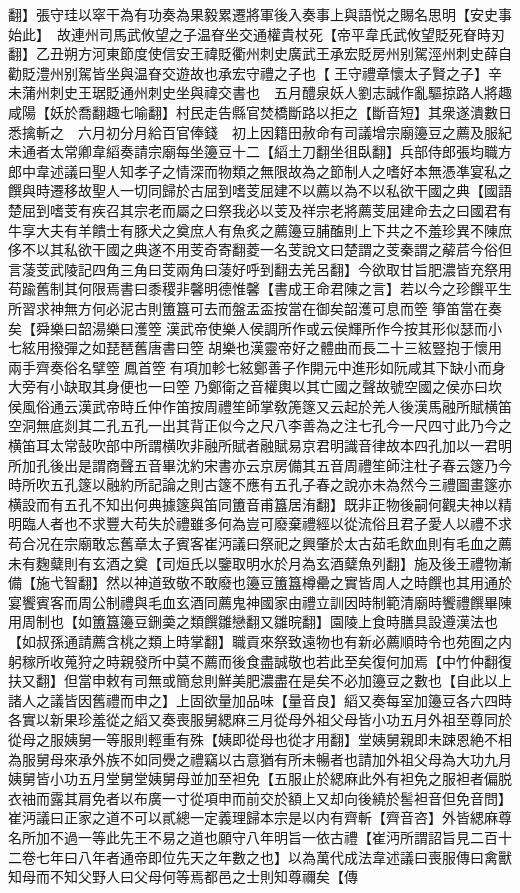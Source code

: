 翻】張守珪以窣干為有功奏為果毅累遷將軍後入奏事上與語悦之賜名思明【安史事始此】　故連州司馬武攸望之子温眘坐交通權貴杖死【帝平韋氏武攸望貶死眘時刃翻】乙丑朔方河東節度使信安王禕貶衢州刺史廣武王承宏貶房州别駕涇州刺史薛自勸貶澧州别駕皆坐與温眘交遊故也承宏守禮之子也【王守禮章懷太子賢之子】辛未蒲州刺史王琚貶通州刺史坐與禕交書也　五月醴泉妖人劉志誠作亂驅掠路人將趣咸陽【妖於喬翻趣七喻翻】村民走告縣官焚橋斷路以拒之【斷音短】其衆遂潰數日悉擒斬之　六月初分月給百官俸錢　初上因籍田赦命有司議增宗廟籩豆之薦及服紀未通者太常卿韋縚奏請宗廟每坐籩豆十二【縚土刀翻坐徂臥翻】兵部侍郎張均職方郎中韋述議曰聖人知孝子之情深而物類之無限故為之節制人之嗜好本無憑凖宴私之饌與時遷移故聖人一切同歸於古屈到嗜芰屈建不以薦以為不以私欲干國之典【國語楚屈到嗜芰有疾召其宗老而屬之曰祭我必以芰及祥宗老將薦芰屈建命去之曰國君有牛享大夫有羊饋士有豚犬之奠庶人有魚炙之薦籩豆脯醢則上下共之不羞珍異不陳庶侈不以其私欲干國之典遂不用芰奇寄翻菱一名芰說文曰楚謂之芰秦謂之薢茩今俗但言蓤芰武陵記四角三角曰芰兩角曰蓤好呼到翻去羌呂翻】今欲取甘旨肥濃皆充祭用苟踰舊制其何限焉書曰黍稷非馨明德惟馨【書成王命君陳之言】若以今之珍饌平生所習求神無方何必泥古則簠簋可去而盤盂盃按當在御矣韶濩可息而箜箏笛當在奏矣【舜樂曰韶湯樂曰濩箜漢武帝使樂人侯調所作或云侯輝所作今按其形似瑟而小七絃用撥彈之如琵琶舊唐書曰箜胡樂也漢靈帝好之體曲而長二十三絃豎抱于懷用兩手齊奏俗名擘箜鳳首箜有項加軫七絃鄭善子作開元中進形如阮咸其下缺小而身大旁有小缺取其身便也一曰箜乃鄭衛之音權輿以其亡國之聲故號空國之侯亦曰坎侯風俗通云漢武帝時丘仲作笛按周禮笙師掌敎箎篴又云起於羌人後漢馬融所賦横笛空洞無底剡其二孔五孔一出其背正似今之尺八李善為之注七孔今一尺四寸此乃今之横笛耳太常鼔吹部中所謂横吹非融所賦者融賦易京君明識音律故本四孔加以一君明所加孔後出是謂商聲五音畢沈約宋書亦云京房備其五音周禮笙師注杜子春云篴乃今時所吹五孔篴以融約所記論之則古篴不應有五孔子春之說亦未為然今三禮圖畫篴亦横設而有五孔不知出何典據篴與笛同簠音甫簋居洧翻】既非正物後嗣何觀夫神以精明臨人者也不求豐大苟失於禮雖多何為豈可廢棄禮經以從流俗且君子愛人以禮不求苟合况在宗廟敢忘舊章太子賓客崔沔議曰祭祀之興肇於太古茹毛飲血則有毛血之薦未有麴糵則有玄酒之奠【司烜氏以鑒取明水於月為玄酒糵魚列翻】施及後王禮物漸備【施弋智翻】然以神道致敬不敢廢也籩豆簠簋樽罍之實皆周人之時饌也其用通於宴饗賓客而周公制禮與毛血玄酒同薦鬼神國家由禮立訓因時制範清廟時饗禮饌畢陳用周制也【如簠簋籩豆鉶羮之類饌雛戀翻又雛晥翻】園陵上食時膳具設遵漢法也【如叔孫通請薦含桃之類上時掌翻】職貢來祭致遠物也有新必薦順時令也苑囿之内躬稼所收蒐狩之時親發所中莫不薦而後食盡誠敬也若此至矣復何加焉【中竹仲翻復扶又翻】但當申敕有司無或簡怠則鮮美肥濃盡在是矣不必加籩豆之數也【自此以上諸人之議皆因舊禮而申之】上固欲量加品味【量音良】縚又奏每室加籩豆各六四時各實以新果珍羞從之縚又奏喪服舅緦麻三月從母外祖父母皆小功五月外祖至尊同於從母之服姨舅一等服則輕重有殊【姨即從母也從才用翻】堂姨舅親即未踈恩絶不相為服舅母來承外族不如同㸑之禮竊以古意猶有所未暢者也請加外祖父母為大功九月姨舅皆小功五月堂舅堂姨舅母並加至袒免【五服止於緦麻此外有袒免之服袒者偏脱衣䄂而露其肩免者以布廣一寸從項申而前交於額上又却向後繞於䯻袒音但免音問】崔沔議曰正家之道不可以貳總一定義理歸本宗是以内有齊斬【齊音咨】外皆緦麻尊名所加不過一等此先王不易之道也願守八年明旨一依古禮【崔沔所謂詔旨見二百十二卷七年曰八年者通帝即位先天之年數之也】以為萬代成法韋述議曰喪服傳曰禽獸知母而不知父野人曰父母何等焉都邑之士則知尊禰矣【傳